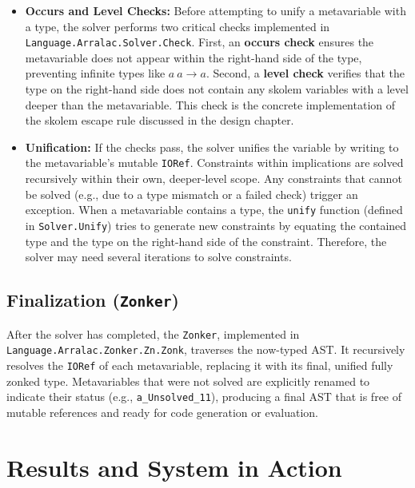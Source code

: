 \begin{itemize}
    \item \textbf{Occurs and Level Checks:} Before attempting to unify a metavariable with a type, the solver performs two critical checks implemented in \\ \texttt{Language.Arralac.Solver.Check}. First, an \textbf{occurs check} ensures the metavariable does not appear within the right-hand side of the type, preventing infinite types like $a ~ a \rightarrow a$. Second, a \textbf{level check} verifies that the type on the right-hand side does not contain any skolem variables with a level deeper than the metavariable. This check is the concrete implementation of the skolem escape rule discussed in the design chapter.

    \item \textbf{Unification:} If the checks pass, the solver unifies the variable by writing to the metavariable's mutable \texttt{IORef}. Constraints within implications are solved recursively within their own, deeper-level scope. Any constraints that cannot be solved (e.g., due to a type mismatch or a failed check) trigger an exception. When a metavariable contains a type, the \texttt{unify} function (defined in \texttt{Solver.Unify}) tries to generate new constraints by equating the contained type and the type on the right-hand side of the constraint. Therefore, the solver may need several iterations to solve constraints.
\end{itemize}

\subsection{Finalization (\texttt{Zonker})}
After the solver has completed, the \texttt{Zonker}, implemented in \\ \texttt{Language.Arralac.Zonker.Zn.Zonk}, traverses the now-typed AST. It recursively resolves the \texttt{IORef} of each metavariable, replacing it with its final, unified fully zonked type. Metavariables that were not solved are explicitly renamed to indicate their status (e.g., \texttt{a\_Unsolved\_11}), producing a final AST that is free of mutable references and ready for code generation or evaluation.

\section{Results and System in Action}
\label{sec:Implementation:Results}

